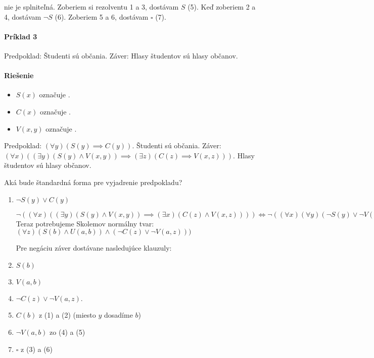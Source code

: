nie je splniteľná. Zoberiem si rezolventu 1 a 3, dostávam $S$ (5). Keď zoberiem 
2 a 4, dostávam $\neg S$ (6). Zoberiem 5 a 6, dostávam $\square$ (7).

\paragraph{Príklad 3} Predpoklad: Študenti sú občania. Záver: Hlasy študentov sú
hlasy občanov.

\paragraph{Riešenie} 
\begin{itemize}
	\item $S(x)$ označuje .
	\item $C(x)$ označuje .
	\item $V(x,y)$ označuje .
\end{itemize}
Predpoklad: $(\forall y) (S(y)\implies C(y))$. Študenti sú občania.
Záver: $(\forall x) ((\exists y) (S(y) \land V(x,y)) \implies (\exists z)(C(z)
\implies V(x,z)))$. Hlasy študentov sú hlasy občanov.

Aká bude štandardná forma pre vyjadrenie predpokladu?
\begin{enumerate}
	\item $\neg S(y) \lor C(y)$
		\par $\neg ((\forall x) ((\exists y)(S(y)\land V(x,y)) \implies
		(\exists x)(C(z) \land V(x,z)))) \iff 
		\neg ((\forall x)(\forall y)(\neg S(y)\lor \neg V(x,y)) \lor
		(\exists z)(C(z)\land V(x,z))) \iff 
		\neg ((\forall x)(\forall y)(\exists x)(\neg S(y) \lor
		\neg U(x,y)\lor (C(z) \land V(x,z)))) \iff
		(\exists x)(\exists y)(\forall z) (S(y) \land V(x,y)) \land
		(\neg C(z) \lor \neg V(x,z))$
		Teraz potrebujeme Skolemov normálny tvar:
		$(\forall z)(S(b) \land U(a,b)) \land(\neg C(z) \lor \neg
		V(a,z)))$
		\par Pre negáciu záver dostávane nasledujúce klauzuly:
	\item $S(b)$
	\item $V(a,b)$
	\item $\neg C(z) \lor \neg V(a,z)$.

	\item $C(b)$ z (1) a (2) (miesto $y$ dosadíme $b$)
	\item $\neg V(a,b)$ zo (4) a (5)
	\item $\square$ z (3)  a (6)
\end{enumerate}

